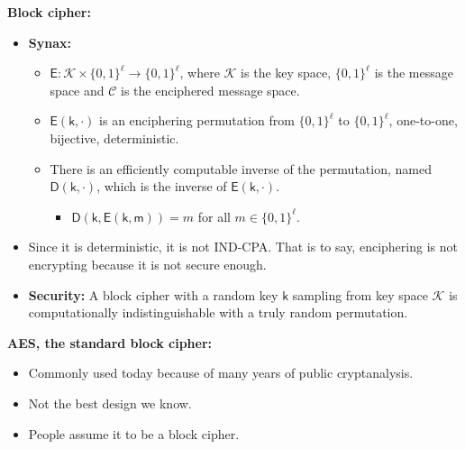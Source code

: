 \documentclass{article}
\newcommand{\msf}[1]{\mathsf{#1}}
\newcommand{\parhead}[1]{\noindent \textbf{#1}}
\begin{document}
\parhead{Block cipher:}
\begin{itemize}
    \item {\bf Synax:}
    \begin{itemize}
        \item $\mathsf{E}: \mathcal{K}\times \{0,1\}^\ell \rightarrow \{0,1\}^\ell$, where $\mathcal{K}$ is the key space, $\{0,1\}^\ell$ is the message space and $\mathcal{C}$ is the enciphered message space.
        
        \item $\mathsf{E}(\msf{k},\cdot)$ is an enciphering permutation from $\{0,1\}^\ell$ to $\{0,1\}^\ell$, one-to-one, bijective, deterministic.
        
        \item There is an efficiently computable inverse of the permutation, named $\mathsf{D}(\msf{k},\cdot)$, which is the inverse of $\mathsf{E}(\msf{k},\cdot)$. 
        
        \begin{itemize}
            \item $\mathsf{D}(\msf{k},\msf{E}(\msf{k},\msf{m}))=m$ for all $m\in\{0,1\}^\ell$.
        \end{itemize}
    \end{itemize}
    
    \item Since it is deterministic, it is not IND-CPA. That is to say, enciphering is not encrypting because it is not secure enough.
    
    \item {\bf Security:} A block cipher with a random key $\msf{k}$ sampling from key space $\mathcal{K}$ is computationally indistinguishable with a truly random permutation.
\end{itemize}

\parhead{AES, the standard block cipher:}
\begin{itemize}
    \item Commonly used today because of many years of public cryptanalysis. 
    
    \item Not the best design we know. 
    
    \item People assume it to be a block cipher.
\end{itemize}

\newpage
\end{document}
